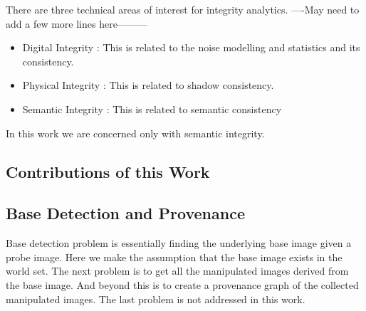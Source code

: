 \documentclass{article}
\begin{document}
There are three technical areas of interest for integrity analytics. \cite{MedF_dw}
\newline
----May need to add a few more lines here---------
\begin{itemize}
\item Digital Integrity : This is related to the noise modelling and statistics and its consistency.
\item Physical Integrity : This is related to shadow consistency.
\item Semantic Integrity : This is related to semantic consistency
\end{itemize}

In this work we are concerned only with semantic integrity.

\subsection{Contributions of this Work}

\subsection{Base Detection and Provenance}
Base detection problem is essentially finding the underlying base image given a probe image. Here we make the assumption that the base image exists in the world set. The next problem is to get all the manipulated images derived from the base image. And beyond this is to create a provenance graph of the collected manipulated images. The last problem is not addressed in this work.
\end{document}
